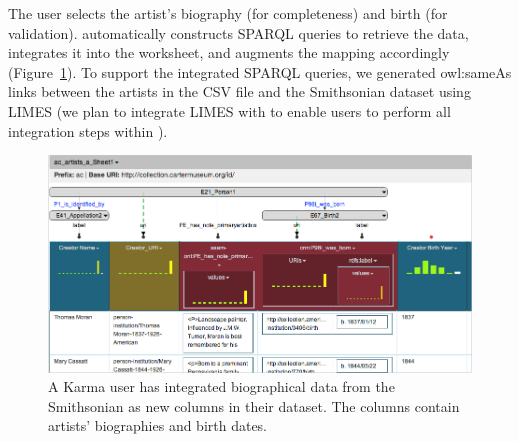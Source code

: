 The user selects the artist's biography (for completeness) and birth (for validation). \karma automatically constructs SPARQL queries to retrieve the data, integrates it into the worksheet, and augments the \rtworml mapping accordingly (Figure~\ref{fig:augment-screenshot}). 
To support the integrated SPARQL queries, we generated owl:sameAs links between the artists in the CSV file and the Smithsonian dataset using LIMES \cite{ngomo2011limes} (we plan to integrate LIMES with \karma to enable users to perform all integration steps within \karma). 
\begin{figure}[htb]
\centering
\includegraphics[width=4.9in]{images/6-augment.png}
\vspace{-5mm}
\caption{A Karma user has integrated biographical data from the Smithsonian as new columns in their dataset. The columns contain artists' biographies and birth dates.}
\vspace{-15pt}
\label{fig:augment-screenshot}
\end{figure}